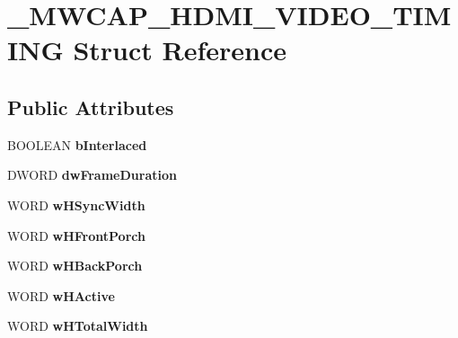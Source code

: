 \hypertarget{struct__MWCAP__HDMI__VIDEO__TIMING}{\section{\-\_\-\-M\-W\-C\-A\-P\-\_\-\-H\-D\-M\-I\-\_\-\-V\-I\-D\-E\-O\-\_\-\-T\-I\-M\-I\-N\-G Struct Reference}
\label{struct__MWCAP__HDMI__VIDEO__TIMING}
}
\subsection*{Public Attributes}
\begin{DoxyCompactItemize}
\item 
\hypertarget{struct__MWCAP__HDMI__VIDEO__TIMING_a20aeb22411cfd50fa694e1b03c295e82}{B\-O\-O\-L\-E\-A\-N {\bfseries b\-Interlaced}}\label{struct__MWCAP__HDMI__VIDEO__TIMING_a20aeb22411cfd50fa694e1b03c295e82}

\item 
\hypertarget{struct__MWCAP__HDMI__VIDEO__TIMING_a1166e6e16c273d81b8aa398005654930}{D\-W\-O\-R\-D {\bfseries dw\-Frame\-Duration}}\label{struct__MWCAP__HDMI__VIDEO__TIMING_a1166e6e16c273d81b8aa398005654930}

\item 
\hypertarget{struct__MWCAP__HDMI__VIDEO__TIMING_ac9dd66f7847756d70ce921924c3e0df6}{W\-O\-R\-D {\bfseries w\-H\-Sync\-Width}}\label{struct__MWCAP__HDMI__VIDEO__TIMING_ac9dd66f7847756d70ce921924c3e0df6}

\item 
\hypertarget{struct__MWCAP__HDMI__VIDEO__TIMING_a7c2f418a19219f63cba4840c3b87271d}{W\-O\-R\-D {\bfseries w\-H\-Front\-Porch}}\label{struct__MWCAP__HDMI__VIDEO__TIMING_a7c2f418a19219f63cba4840c3b87271d}

\item 
\hypertarget{struct__MWCAP__HDMI__VIDEO__TIMING_a49925ecb695cba0c65eda50dced22083}{W\-O\-R\-D {\bfseries w\-H\-Back\-Porch}}\label{struct__MWCAP__HDMI__VIDEO__TIMING_a49925ecb695cba0c65eda50dced22083}

\item 
\hypertarget{struct__MWCAP__HDMI__VIDEO__TIMING_a0343e4eb3a800632c46a3dfffe7de28b}{W\-O\-R\-D {\bfseries w\-H\-Active}}\label{struct__MWCAP__HDMI__VIDEO__TIMING_a0343e4eb3a800632c46a3dfffe7de28b}

\item 
\hypertarget{struct__MWCAP__HDMI__VIDEO__TIMING_a61b423bde3b53041b67046138ea40ceb}{W\-O\-R\-D {\bfseries w\-H\-Total\-Width}}\label{struct__MWCAP__HDMI__VIDEO__TIMING_a61b423bde3b53041b67046138ea40ceb}


\end{DoxyCompactItemize}
